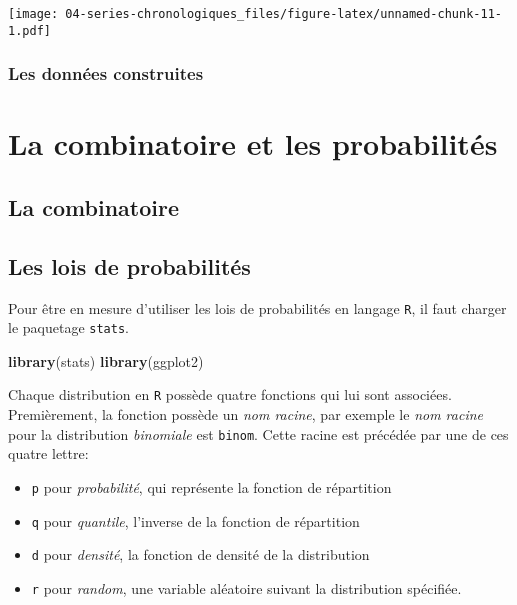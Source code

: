 \documentclass[]{book}
\newenvironment{Shaded}{\begin{snugshade}}{\end{snugshade}}
\newcommand{\KeywordTok}[1]{\textcolor[rgb]{0.13,0.29,0.53}{\textbf{#1}}}
\newcommand{\NormalTok}[1]{#1}
\providecommand{\tightlist}{%
  \setlength{\itemsep}{0pt}\setlength{\parskip}{0pt}}
\begin{document}
\texttt{[image: 04-series-chronologiques\_files/figure-latex/unnamed-chunk-11-1.pdf]}

\section{Les données construites}\label{les-donnees-construites}

\part{La combinatoire et les
probabilités}\label{part-la-combinatoire-et-les-probabilites}

\chapter{La combinatoire}\label{la-combinatoire}

\chapter{Les lois de probabilités}\label{les-lois-de-probabilites}

Pour être en mesure d'utiliser les lois de probabilités en langage
\texttt{R}, il faut charger le paquetage \texttt{stats}.

\begin{Shaded}
\begin{Highlighting}[]
\KeywordTok{library}\NormalTok{(stats)}
\KeywordTok{library}\NormalTok{(ggplot2)}
\end{Highlighting}
\end{Shaded}

Chaque distribution en \texttt{R} possède quatre fonctions qui lui sont
associées. Premièrement, la fonction possède un \emph{nom racine}, par
exemple le \emph{nom racine} pour la distribution \emph{binomiale} est
\texttt{binom}. Cette racine est précédée par une de ces quatre lettre:

\begin{itemize}
\tightlist
\item
  \texttt{p} pour \emph{probabilité}, qui représente la fonction de
  répartition
\item
  \texttt{q} pour \emph{quantile}, l'inverse de la fonction de
  répartition
\item
  \texttt{d} pour \emph{densité}, la fonction de densité de la
  distribution
\item
  \texttt{r} pour \emph{random}, une variable aléatoire suivant la
  distribution spécifiée.
\end{itemize}
\end{document}
